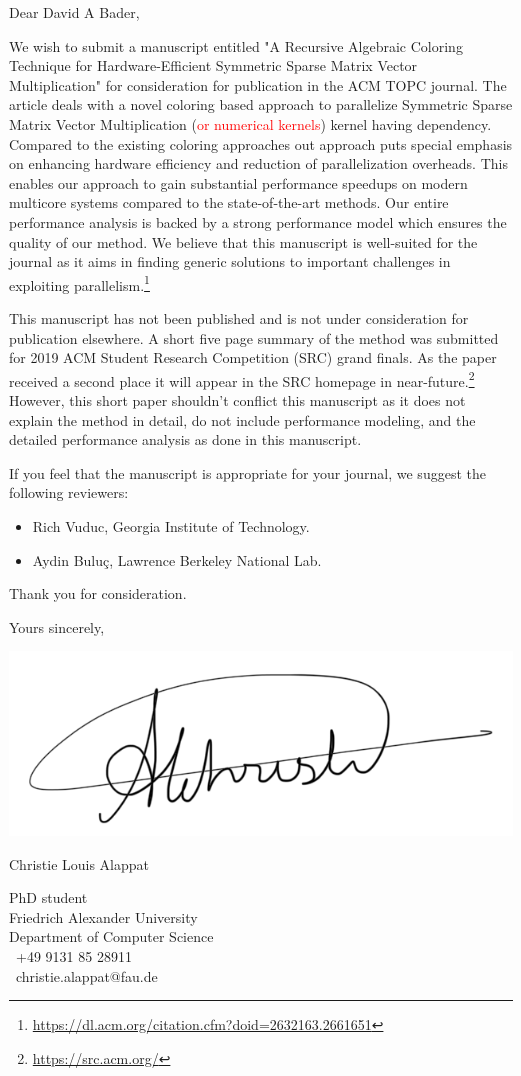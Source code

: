\documentclass[english,10pt]{ethbrief3}
\date{June 01, 2019} %
\newcommand*{\marvosymbol}[1]{{\fontfamily{mvs}\fontencoding{U}\fontseries{m}\fontshape{n}\selectfont\char#1}}
\begin{document}

\opening{Dear David A Bader, }
We wish to submit a manuscript entitled "A Recursive Algebraic Coloring Technique for
Hardware-Efficient Symmetric Sparse Matrix Vector Multiplication" for consideration for
publication in the ACM TOPC journal. The article deals with a novel coloring based approach to 
parallelize Symmetric Sparse Matrix Vector Multiplication (\textcolor{red}{or numerical kernels}) 
kernel having dependency.  Compared to the existing coloring approaches out approach puts 
special emphasis on enhancing hardware efficiency and reduction of parallelization overheads.
This enables our approach to gain substantial performance speedups on modern multicore systems
compared to the state-of-the-art methods. Our entire performance analysis is backed by a strong 
performance model which ensures the quality of our method.
We believe that this manuscript is well-suited for the journal as it aims in finding
generic solutions to important challenges in exploiting parallelism.\footnote{\href{https://dl.acm.org/citation.cfm?doid=2632163.2661651}{https://dl.acm.org/citation.cfm?doid=2632163.2661651}}

This manuscript has not been published and is not under consideration for publication elsewhere.
A short five page summary of the method was submitted for 2019 ACM Student Research Competition (SRC) grand finals. 
As the paper received a second place it will appear in the SRC homepage in near-future.\footnote{\href{https://src.acm.org/}{https://src.acm.org/}}
 However, this short paper shouldn't conflict this manuscript as it does not explain
the method in detail, do not include performance modeling, and the detailed performance analysis
as done in this manuscript.

If you feel that the manuscript is appropriate for your journal, we suggest the following
reviewers:
\begin{itemize}
	\item Rich Vuduc, Georgia Institute of Technology.
	\item Aydin Buluç, Lawrence Berkeley National Lab.
\end{itemize}

Thank you for consideration.

\closing{Yours sincerely,}

\vspace{-2.7cm}

\includegraphics[width=0.28\linewidth]{signature_alappat_christie.png}

Christie Louis Alappat

PhD student\\
Friedrich Alexander University\\
Department of Computer Science\\ 
\marvosymbol{72}~+49 9131 85 28911\\
\marvosymbol{66}~christie.alappat@fau.de\\
\end{document}
